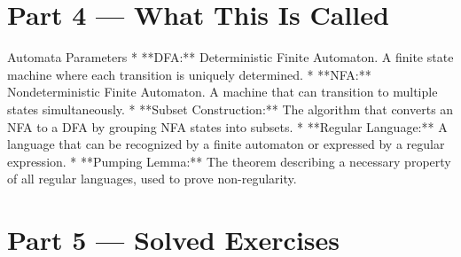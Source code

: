 \documentclass[12pt, a4paper]{book}
\begin{document}
\newpage

\section{Part 4 --- What This Is Called}

\begin{namedconcept}{Automata Parameters}
* **DFA:** Deterministic Finite Automaton. A finite state machine where each transition is uniquely determined.
* **NFA:** Nondeterministic Finite Automaton. A machine that can transition to multiple states simultaneously.
* **Subset Construction:** The algorithm that converts an NFA to a DFA by grouping NFA states into subsets.
* **Regular Language:** A language that can be recognized by a finite automaton or expressed by a regular expression.
* **Pumping Lemma:** The theorem describing a necessary property of all regular languages, used to prove non-regularity.
\end{namedconcept}

\newpage

\section{Part 5 --- Solved Exercises}
\end{document}
